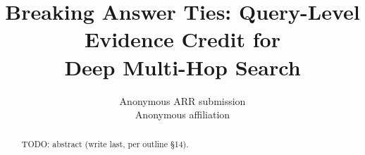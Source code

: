 \documentclass[11pt]{article}
\title{Breaking Answer Ties: Query-Level Evidence Credit for\\
Deep Multi-Hop Search}
\author{Anonymous ARR submission \\ Anonymous affiliation}
\begin{document}
\maketitle

\begin{abstract}
TODO: abstract (write last, per outline \S14).
\end{abstract}

\newcommand{\stub}[2]{\section{#2}\label{#1}TODO.}





\appendix

\end{document}
